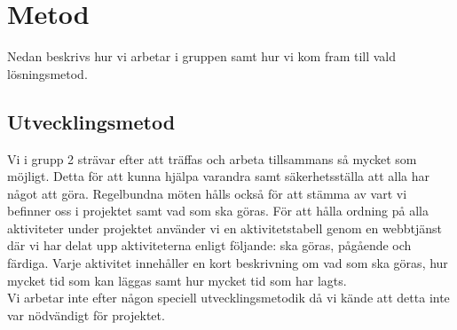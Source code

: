 \section{Metod}
Nedan beskrivs hur vi arbetar i gruppen samt hur vi kom fram till vald lösningsmetod. 

\subsection{Utvecklingsmetod}
Vi i grupp 2 strävar efter att träffas och arbeta tillsammans så mycket som möjligt. Detta för att kunna hjälpa varandra samt säkerhetsställa att alla har något att göra. Regelbundna möten hålls också för att stämma av vart vi befinner oss i projektet samt vad som ska göras. För att hålla ordning på alla aktiviteter under projektet använder vi en aktivitetstabell genom en webbtjänst där vi har delat upp aktiviteterna enligt följande: ska göras, pågående och färdiga. Varje aktivitet innehåller en kort beskrivning om vad som ska göras, hur mycket tid som kan läggas samt hur mycket tid som har lagts. 
\\
Vi arbetar inte efter någon speciell utvecklingsmetodik då vi kände att detta inte var nödvändigt för projektet.      




